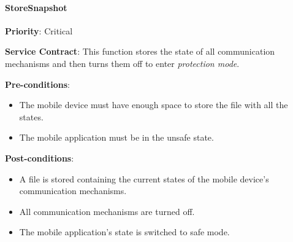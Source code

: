 	    \paragraph{StoreSnapshot}
			\begin{description}
			    \item{\textbf{Priority}:} Critical
			    \item{\textbf{Service Contract}:} This function stores the state of all communication mechanisms and then turns them off to enter \textit{protection mode}.
			    \item{\textbf{Pre-conditions}:}
    			    \begin{itemize}
    			        \item The mobile device must have enough space to store the file with all the states. 
    			        \item The mobile application must be in the unsafe state.
    			    \end{itemize}
			    \item{\textbf{Post-conditions}:} 
    			    \begin{itemize}
    			    \item A file is stored containing the current states of the mobile device's communication mechanisms.
    			    \item All communication mechanisms are turned off.
    			    \item The mobile application's state is switched to safe mode. 
    			    \end{itemize}
			\end{description}
			
